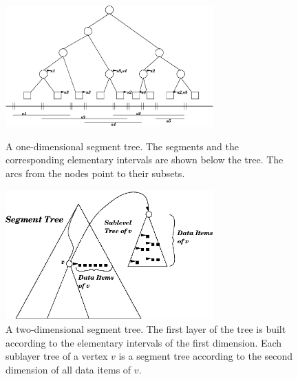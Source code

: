 \begin{ccTexOnly}
\begin{figure}[htbp]
\centering
\begin{minipage}{11cm}
    \begin{center}
    \includegraphics[width=8cm,clip]{segment2.eps}
    \end{center}
\caption{\label{User:fig:segment2.eps}A one-dimensional segment
  tree. The segments and the corresponding elementary intervals
  are shown below the tree. The arcs from the nodes point to
  their subsets.}
\vspace{2\baselineskip}
\end{minipage}
\hspace*{1em}
\begin{minipage}{11cm}
    \begin{center}
    \includegraphics[width=8cm,clip]{d-segment.eps}
    \end{center}
\caption{\label{User:fig:d-segment.eps}A two-dimensional segment
  tree. The first layer of the tree is built according to the
  elementary intervals of the first dimension. Each
  sublayer tree of a vertex $v$ is a segment tree according to
  the  second dimension of all data items of $v$.}

\end{minipage}
\end{figure}
\end{ccTexOnly}

